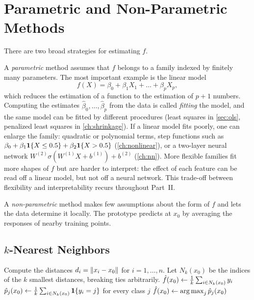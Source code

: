 \section{Parametric and Non-Parametric Methods}\label{sec:param-nonparam}

There are two broad strategies for estimating $f$.

A \emph{parametric} method assumes that $f$ belongs to a family indexed by finitely many parameters. The most important example is the linear model
\[
f(X)=\beta_0+\beta_1X_1+\dots+\beta_pX_p,
\]
which reduces the estimation of a function to the estimation of $p+1$ numbers. Computing the estimates $\hat\beta_0,\dots,\hat\beta_p$ from the data is called \emph{fitting} the model, and the same model can be fitted by different procedures (least squares in \cref{sec:ols}, penalized least squares in \cref{ch:shrinkage}). If a linear model fits poorly, one can enlarge the family: quadratic or polynomial terms, step functions such as $\beta_0+\beta_1\mathbf{1}\{X\le0.5\}+\beta_2\mathbf{1}\{X>0.5\}$ (\cref{ch:nonlinear}), or a two-layer neural network $W^{(2)}\sigma(W^{(1)}X+b^{(1)})+b^{(2)}$ (\cref{ch:nn}). More flexible families fit more shapes of $f$ but are harder to interpret: the effect of each feature can be read off a linear model, but not off a neural network. This trade-off between flexibility and interpretability recurs throughout Part~II.

A \emph{non-parametric} method makes few assumptions about the form of $f$ and lets the data determine it locally. The prototype predicts at $x_0$ by averaging the responses of nearby training points.

\subsection{$k$-Nearest Neighbors}\label{sec:knn}

\begin{algorithm}[H]
\caption{$k$-Nearest Neighbors}\label{alg:knn}
\begin{algorithmic}[1]
\State Compute the distances $d_i=\lVert x_i-x_0\rVert$ for $i=1,\dots,n$.
\State Let $N_k(x_0)$ be the indices of the $k$ smallest distances, breaking ties arbitrarily.
  \State $\hat f(x_0)\gets\frac1k\sum_{i\in N_k(x_0)}y_i$ 
\Else
  \State $\hat p_j(x_0)\gets\frac1k\sum_{i\in N_k(x_0)}\mathbf{1}\{y_i=j\}$ for every class $j$
  \State $\hat f(x_0)\gets\operatorname*{arg\,max}_j\hat p_j(x_0)$ 
\EndIf
{}
\end{algorithmic}
\end{algorithm}


